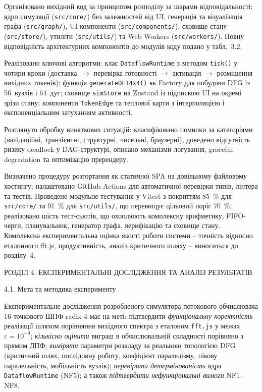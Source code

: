 \documentclass[
]{article}
\begin{document}
Організовано вихідний код за принципом розподілу за шарами
відповідальності: ядро симуляції
(\texttt{src}\texttt{/}\texttt{core}\texttt{/}) без залежностей від UI,
генерація та візуалізація графа
(\texttt{src}\texttt{/}\texttt{graph}\texttt{/}), UI-компоненти
(\texttt{src}\texttt{/}\texttt{components}\texttt{/}), сховище стану
(\texttt{src}\texttt{/}\texttt{store}\texttt{/}), утиліти
(\texttt{src}\texttt{/}\texttt{utils}\texttt{/}) та Web Workers
(\texttt{src}\texttt{/}\texttt{workers}\texttt{/}). Повну відповідність
архітектурних компонентів до модулів коду подано у табл.~3.2.

Реалізовано ключові алгоритми: клас \texttt{DataflowRuntime} з методом
\texttt{tick}\texttt{()} у чотири кроки (доставка~\(\rightarrow\)
перевірка готовності \(\rightarrow\) активація \(\rightarrow\)
розміщення вихідних токенів); функція \texttt{generateDFT4x4()} як
Factory для побудови DFG із 56~вузлів і 64~дуг; сховище
\texttt{simStore} на Zustand із підпискою UI на окремі зрізи стану;
компоненти \texttt{TokenEdge} та теплової карти з інтерполяцією і
експоненціальним затуханням активності.

Розглянуто обробку виняткових ситуацій: класифіковано помилки за
категоріями (валідаційні, транзієнтні, структурні, чисельні, браузерні),
доведено відсутність ризику deadlock у DAG-структурі, описано механізми
логування, graceful degradation та оптимізацію пререндеру.

Визначено процедуру розгортання як статичної SPA на довільному файловому
хостингу; налаштовано GitHub Actions для автоматичної перевірки типів,
лінтера та тестів. Проведено модульне тестування у Vitest з покриттям
85~\% для \texttt{src}\texttt{/}\texttt{core}\texttt{/} та 91~\% для
\texttt{src}\texttt{/}\texttt{utils}\texttt{/}, що перевищує цільовий
поріг 70~\%; реалізовано шість тест-сьютів, що охоплюють комплексну
арифметику, FIFO-черги, планувальник, генератор графа, верифікацію та
сховище стану. Комплексна експериментальна оцінка якості роботи системи
-- точність відносно еталонного fft.js, продуктивність, аналіз
критичного шляху -- виноситься до розділу~4.

\protect{}\label{_Toc229681164}{}РОЗДІЛ 4. ЕКСПЕРИМЕНТАЛЬНІ
ДОСЛІДЖЕННЯ ТА АНАЛІЗ РЕЗУЛЬТАТІВ

\protect{}\label{_Toc229681165}{}4.1. Мета та методика
експерименту

Експериментальне дослідження розробленого симулятора потокового
обчислювача 16-точкового ШПФ radix-4 має на меті: підтвердити
\emph{функціональну коректність} реалізації шляхом порівняння вихідного
спектра з еталоном \texttt{fft.js} у межах
\(\varepsilon = 10^{- 9}\); \emph{кількісно оцінити} виграш в
обчислювальній складності порівняно з прямим ДПФ; \emph{виміряти}
параметри розкладу за реальною топологією DFG (критичний шлях,
послідовну роботу, коефіцієнт паралелізму, пікову паралельність,
мобільність вузлів); \emph{перевірити детермінованість} ядра
\texttt{DataflowRuntime} (NF5); а також \emph{підтвердити нефункціональні
вимоги} NF1--NF8.
\end{document}
